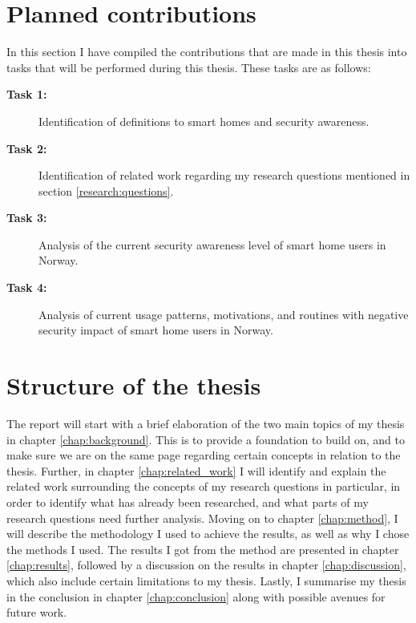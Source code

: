 \section{Planned contributions}
In this section I have compiled the contributions that are made in this thesis into tasks that will be performed during this thesis. These tasks are as follows:
\begin{description}
    \item[\textbf{Task 1:}] Identification of definitions to smart homes and security awareness. 
    \item[\textbf{Task 2:}] Identification of related work regarding my research questions mentioned in section \ref{research:questions}. 
    \item[\textbf{Task 3:}] Analysis of the current security awareness level of smart home users in Norway.
    \item[\textbf{Task 4:}] Analysis of current usage patterns, motivations, and routines with negative security impact of smart home users in Norway.
\end{description}

\section{Structure of the thesis}
The report will start with a brief elaboration of the two main topics of my thesis in chapter \ref{chap:background}. This is to provide a foundation to build on, and to make sure we are on the same page regarding certain concepts in relation to the thesis. Further, in chapter \ref{chap:related_work} I will identify and explain the related work surrounding the concepts of my research questions in particular, in order to identify what has already been researched, and what parts of my research questions need further analysis. Moving on to chapter \ref{chap:method}, I will describe the methodology I used to achieve the results, as well as why I chose the methods I used. The results I got from the method are presented in chapter \ref{chap:results}, followed by a discussion on the results in chapter \ref{chap:discussion}, which also include certain limitations to my thesis. Lastly, I summarise my thesis in the conclusion in chapter \ref{chap:conclusion} along with possible avenues for future work. 

